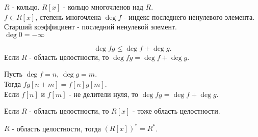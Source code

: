 \documentclass[11pt, oneside]{article}   	%
\begin{document}
    \begin{definition}
        $R$ - кольцо. $R[x]$ - кольцо многочленов над $R$.\\
        $f\in R[x]$, степень многочлена $\deg f$ - индекс последнего ненулевого элемента. Старший коэффициент - последний ненулевой элемент.\\
        $\deg 0 = -\infty$
    \end{definition}
    \begin{dlemma}
       \[ \deg fg \le \deg f + \deg g .\]
       Если $R$ - область целостности, то $\deg fg = \deg f + \deg g$.
    \end{dlemma}
    \begin{dlemma}
        Пусть $\deg f = n$, $\deg g = m$.\\
        Тогда $fg[n+m] = f[n]g[m]$.\\
        Если $f[n]$ и $f[m]$ - не делители нуля, то $\deg fg = \deg f + \deg g$.
    \end{dlemma}
    \begin{dlemma}
        Если $R$ - область целостности, то $R[x]$ - тоже область целостности.
    \end{dlemma}
    \begin{dlemma}
        $R$ - область целостности, тогда $(R[x])^{*} = R^{*}$.
    \end{dlemma}
\end{document}
